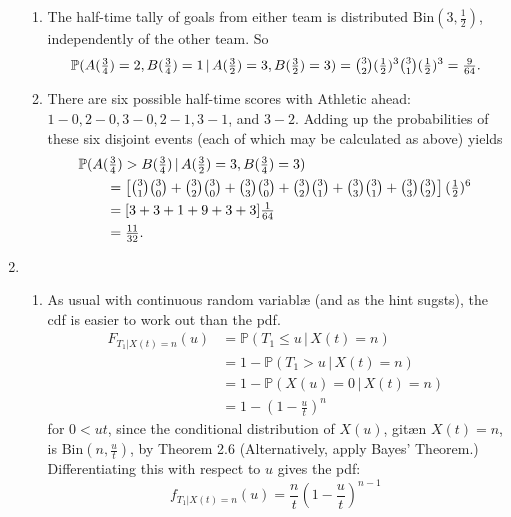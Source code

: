 \documentclass[11pt,a4paper]{article}
\begin{document}
\begin{enumerate}
\begin{enumerate}
            \item The half-time tally of goals from either team is distributed $\text{Bin}(3,\tfrac{1}{2})$, independently of the other team. So
            $$
            \mathbb{P}(A(\tfrac{3}{4})=2,B(\tfrac{3}{4}) = 1\, | \, A(\tfrac{3}{2}) = 3, B(\tfrac{3}{2})=3)
            =
            \tbinom{3}{2}(\tfrac{1}{2})^3\tbinom{3}{1}(\tfrac{1}{2})^3
            =
            \tfrac{9}{64}.
            $$
            \item There are six possible half-time scores with Athletic ahead: $1-0, 2-0, 3-0, 2-1, 3-1$, and $3-2$. Adding up the probabilities of these six disjoint events (each of which may be calculated as above) yields
            \begin{align*}
                & \mathbb{P}(A(\tfrac{3}{4}) > B(\tfrac{3}{4})\, | \, A(\tfrac{3}{2})=3, B(\tfrac{3}{4})=3)\\
                & \qquad = \left[\tbinom{3}{1}\tbinom{3}{0}+ \tbinom{3}{2}\tbinom{3}{0}+\tbinom{3}{3}\tbinom{3}{0}+\tbinom{3}{2}\tbinom{3}{1}+\tbinom{3}{3}\tbinom{3}{1}+\tbinom{3}{3}\tbinom{3}{2}\right](\tfrac{1}{2})^6\\
                & \qquad = [3+3+1+9+3+3]\tfrac{1}{64}\\
                & \qquad = \tfrac{11}{32}.
            \end{align*}
        \end{enumerate}
        \item 
        \begin{enumerate}
            \item As usual with continuous random variablæ (and as the hint sugsts), the cdf is easier to work out than the pdf.
            \begin{align*}
                F_{T_1|X(t)=n}(u) 
                &= \mathbb{P}(T_1 \leq u\, | \, X(t)=n)\\
                &= 1- \mathbb{P}(T_1>u\, | \,X(t) = n)\\
                &= 1- \mathbb{P}(X(u)=0\, | \, X(t) = n)\\
                &= 1-\left(1-\frac{u}{t}\right)^n
            \end{align*}
            for $0 < u t$, since the conditional distribution of $X(u)$, gitæn $X(t) = n$, is $\text{Bin}(n,\tfrac{u}{t})$, by Theorem 2.6 (Alternatively, apply Bayes' Theorem.)\\
            Differentiating this with respect to $u$ gives the pdf:
            $$
            f_{T_1|X(t)=n}(u) = \frac{n}{t}\left(1-\frac{u}{t}\right)^{n-1}
$$
\end{enumerate}
\end{enumerate}
\end{document}
